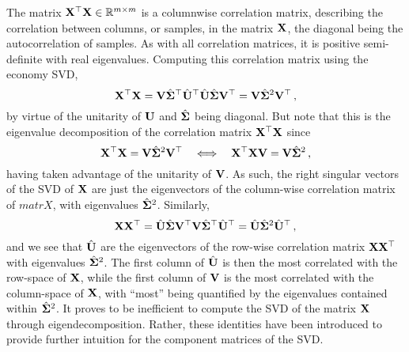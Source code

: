 The matrix $\mathbf{X}^\top\mathbf{X}\in\mathbb{R}^{m\times m}$ is a columnwise
correlation matrix, describing the correlation between columns, or samples,
in the matrix $\mathbf{X}$, the diagonal being the autocorrelation of samples.
As with all correlation matrices, it is positive semi-definite with real
eigenvalues. Computing this correlation matrix using the economy SVD,
%
\begin{displaymath}
  \mathbf{X}^\top\mathbf{X} =
  \mathbf{V}\hat{\mathbf{\Sigma}}^\top\hat{\mathbf{U}}^\top
  \hat{\mathbf{U}}\hat{\mathbf{\Sigma}}\mathbf{V}^\top
  = \mathbf{V}\hat{\mathbf{\Sigma}}^2\mathbf{V}^\top \,,
\end{displaymath}
%
by virtue of the unitarity of $\mathbf{U}$ and $\hat{\mathbf{\Sigma}}$ being
diagonal. But note that this is the eigenvalue decomposition of
the correlation matrix $\mathbf{X}^\top\mathbf{X}$ since
%
\begin{displaymath}
  \mathbf{X}^\top\mathbf{X} = \mathbf{V}\hat{\mathbf{\Sigma}}^2\mathbf{V}^\top
  \quad\Longleftrightarrow\quad
  \mathbf{X}^\top\mathbf{X}\mathbf{V} = \mathbf{V}\hat{\mathbf{\Sigma}}^2 \,,
\end{displaymath}
%
having taken advantage of the unitarity of $\mathbf{V}$. As such, the right
singular vectors of the SVD of $\mathbf{X}$ are just the eigenvectors of
the column-wise correlation matrix of $matr{X}$, with eigenvalues
$\hat{\mathbf{\Sigma}}^2$. Similarly,
%
\begin{displaymath}
  \mathbf{X}\mathbf{X}^\top =
  \hat{\mathbf{U}}\hat{\mathbf{\Sigma}}\mathbf{V}^\top
  \mathbf{V}\hat{\mathbf{\Sigma}}^\top\hat{\mathbf{U}}^\top
  = \hat{\mathbf{U}}\hat{\mathbf{\Sigma}}^2\hat{\mathbf{U}}^\top \,,
\end{displaymath}
%
and we see that $\hat{\mathbf{U}}$ are the eigenvectors of the row-wise
correlation matrix $\mathbf{X}\mathbf{X}^\top$ with eigenvalues
$\hat{\mathbf{\Sigma}}^2$. The first column of $\hat{\mathbf{U}}$ is then
the most correlated with the row-space of $\mathbf{X}$, while the
first column of $\mathbf{V}$ is the most correlated with the column-space
of $\mathbf{X}$, with ``most'' being quantified by the eigenvalues contained
within $\hat{\mathbf{\Sigma}}^2$. It proves to be inefficient to compute the
SVD of the matrix $\mathbf{X}$ through eigendecomposition. Rather, these
identities have been introduced to provide further intuition for the
component matrices of the SVD.\\

